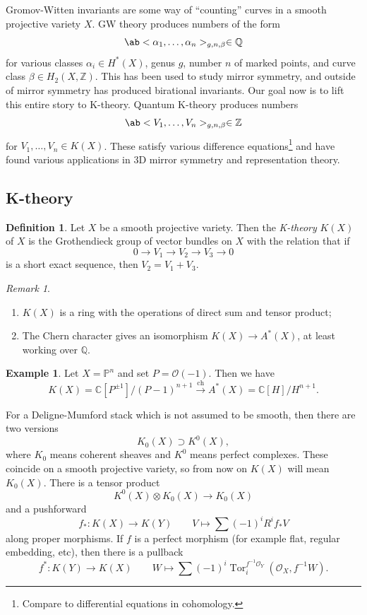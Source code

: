 \documentclass{amsart}
\theoremstyle{definition}
\newtheorem{defn}[thm]{Definition}
\newtheorem{exm}[thm]{Example}
\theoremstyle{remark}
\newtheorem{rmk}[thm]{Remark}
\theoremstyle{plain}
\theoremstyle{definition}
\theoremstyle{remark}
\newcommand{\C}{\mathbb{C}}
\newcommand{\Z}{\mathbb{Z}}
\newcommand{\Q}{\mathbb{Q}}
\renewcommand{\P}{\mathbb{P}}
\newcommand{\mc}[1]{\mathcal{#1}}
\newcommand{\on}[1]{\operatorname{#1}}
\newcommand{\1}{\mathbf{1}}
\newcommand{\2}{\mathbf{2}}
\newcommand{\3}{\mathbf{3}}
\begin{document}
Gromov-Witten invariants are some way of ``counting'' curves in a smooth projective variety \(X\). GW theory produces numbers of the form
\[ \ab<\alpha_1, \ldots, \alpha_n>_{g, n, \beta} \in \Q \]
for various classes \(\alpha_i \in H^*(X)\), genus \(g\), number \(n\) of marked points, and curve class \(\beta \in H_2(X, \Z)\). This has been used to study mirror symmetry, and outside of mirror symmetry has produced birational invariants. Our goal now is to lift this entire story to K-theory. Quantum K-theory produces numbers
\[ \ab<V_1, \ldots, V_n>_{g, n, \beta} \in \Z \]
for \(V_1, \ldots, V_n \in K(X)\). These satisfy various difference equations\footnote{Compare to differential equations in cohomology.} and have found various applications in 3D mirror symmetry and representation theory.

\subsection{K-theory}%
\label{sub:K-theory}

\begin{defn}
    Let \(X\) be a smooth projective variety. Then the \textit{K-theory} \(K(X)\) of \(X\) is the Grothendieck group of vector bundles on \(X\) with the relation that if
    \[ 0 \to V_1 \to V_2 \to V_3 \to 0 \]
    is a short exact sequence, then \(V_2 = V_1 + V_3\).
\end{defn}

\begin{rmk}\leavevmode
    \begin{enumerate}
        \item \(K(X)\) is a ring with the operations of direct sum and tensor product;
        \item The Chern character gives an isomorphism \(K(X) \to A^*(X)\), at least working over \(\Q\).
    \end{enumerate}
\end{rmk}

\begin{exm}
    Let \(X = \P^n\) and set \(P = \mc{O}(-1)\). Then we have
    \[ K(X) = \C[P^{\pm 1}]/(P-1)^{n+1} \xrightarrow{\on{ch}} A^*(X) = \C[H]/H^{n+1}. \]
\end{exm}

For a Deligne-Mumford stack which is not assumed to be smooth, then there are two versions
\[ K_0(X) \supset K^0(X), \]
where \(K_0\) means coherent sheaves and \(K^0\) means perfect complexes. These coincide on a smooth projective variety, so from now on \(K(X)\) will mean \(K_0(X)\). There is a tensor product
\[ K^0(X) \otimes K_0(X) \to K_0(X) \]
and a pushforward
\[ f_* \colon K(X) \to K(Y) \qquad V \mapsto \sum (-1)^i R^i f_* V \]
along proper morphisms. If \(f\) is a perfect morphism (for example flat, regular embedding, etc), then there is a pullback
\[ f^* \colon K(Y) \to K(X) \qquad W \mapsto \sum (-1)^i \on{Tor}_i^{f^{-1} \mc{O}_Y} (\mc{O}_X, f^{-1} W). \]
\end{document}

